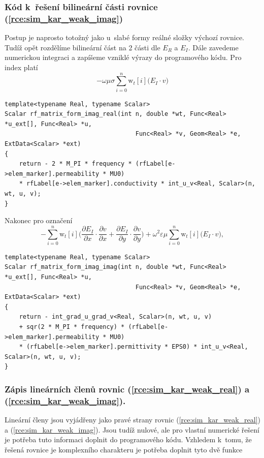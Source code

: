 \subsubsection*{Kód k~řešení bilineární části rovnice (\ref{rce:sim_kar_weak_imag})}
Postup je naprosto totožný jako u~slabé formy reálné složky výchozí rovnice. Tudíž opět rozdělíme bilineární část na 2 části dle $E_R$ a $E_I$. Dále zavedeme numerickou integraci a zapíšeme vzniklé výrazy do programového kódu. Pro index  platí
\begin{equation}
 -\omega\mu\sigma\sum_{i=0}^{n}\mathrm{w}_{t}[i]\bigg(E_I\cdot v\bigg)
	\label{rce:sim_kar_weak_imag_real_num} 
\end{equation}
\begin{verbatim}
template<typename Real, typename Scalar>
Scalar rf_matrix_form_imag_real(int n, double *wt, Func<Real> *u_ext[], Func<Real> *u,
									Func<Real> *v, Geom<Real> *e, ExtData<Scalar> *ext)
{
    return - 2 * M_PI * frequency * (rfLabel[e->elem_marker].permeability * MU0) 
    * rfLabel[e->elem_marker].conductivity * int_u_v<Real, Scalar>(n, wt, u, v);
}
\end{verbatim}
Nakonec pro označení 
\begin{equation}
	-\sum_{i=0}^{n}\mathrm{w}_{t}[i]\bigg(\frac{\partial E_I}{\partial x}\cdot \frac{\partial v}{\partial x} + \frac{\partial E_I}{\partial y}\cdot \frac{\partial v}{\partial y} \bigg) + \omega^{2}\varepsilon\mu\sum_{i=0}^{n}\mathrm{w}_{t}[i]\bigg(E_I\cdot v\bigg),
	\label{rce:sim_kar_weak_imag_imag_num} 
\end{equation}
\begin{verbatim}
template<typename Real, typename Scalar>
Scalar rf_matrix_form_imag_imag(int n, double *wt, Func<Real> *u_ext[], Func<Real> *u,
                                    Func<Real> *v, Geom<Real> *e, ExtData<Scalar> *ext)
{
    return - int_grad_u_grad_v<Real, Scalar>(n, wt, u, v) 
    + sqr(2 * M_PI * frequency) * (rfLabel[e->elem_marker].permeability * MU0) 
    * (rfLabel[e->elem_marker].permittivity * EPS0) * int_u_v<Real, Scalar>(n, wt, u, v);
}
\end{verbatim}

\subsubsection*{Zápis lineárních členů rovnic (\ref{rce:sim_kar_weak_real}) a (\ref{rce:sim_kar_weak_imag}).}
Lineární členy jsou vyjádřeny jako pravé strany rovnic (\ref{rce:sim_kar_weak_real}) a (\ref{rce:sim_kar_weak_imag}). Jsou tudíž nulové, ale pro vlastní numerické řešení je potřeba tuto informaci doplnit do programového kódu. Vzhledem k~tomu, že řešená rovnice je komplexního charakteru je potřeba doplnit tyto dvě funkce 

